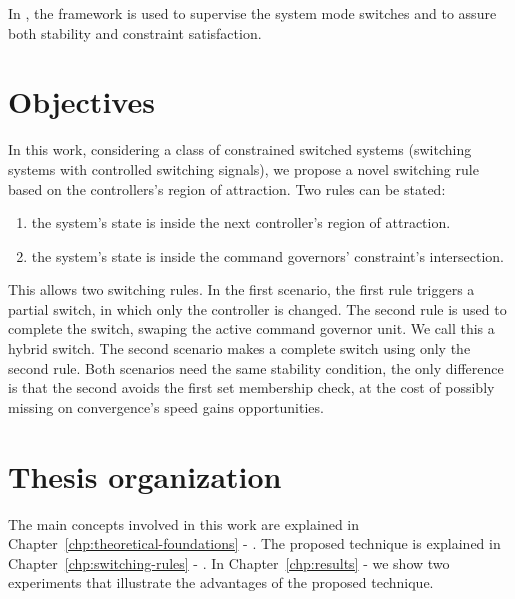 In \parencite{franzè.lucia.ea:command,lucia.franzè:stabilization}, the \CG{}
framework is used to supervise the system mode switches and to assure both
stability and constraint satisfaction.

\section{Objectives}%
\label{sec:objectives}

In this work, considering a class of constrained switched systems (switching
systems with controlled switching signals), we propose a novel switching rule
based on the controllers's region of attraction. Two rules can be stated:

\begin{enumerate}
  \item the system's state is inside the next controller's region of attraction.
  \item the system's state is inside the command governors' constraint's
        intersection.
\end{enumerate}

This allows two switching rules. In the first scenario, the first rule triggers
a partial switch, in which only the controller is changed. The second rule is
used to complete the switch, swaping the active command governor unit. We call
this a hybrid switch. The second scenario makes a complete switch using only the
second rule. Both scenarios need the same stability condition, the only
difference is that the second avoids the first set membership check, at the cost
of possibly missing on convergence's speed gains opportunities.

\section{Thesis organization}%
\label{sec:organization}

The main concepts involved in this work are explained in
Chapter~\ref{chp:theoretical-foundations} -
. The proposed technique is explained in
Chapter~\ref{chp:switching-rules} - . In
Chapter~\ref{chp:results} -  we show two experiments that
illustrate the advantages of the proposed technique.

